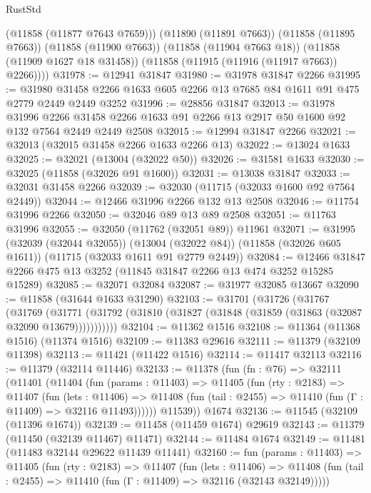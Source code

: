 \begin{lexlean}{RustStd}
\begin{coremodule}
          (@11858 (@11877 @7643 @7659)))
        (@11890 (@11891 @7663))
        (@11858 (@11895 @7663))
        (@11858 (@11900 @7663))
        (@11858 (@11904 @7663 @18))
        (@11858 (@11909 @1627 @18 @31458))
        (@11858 (@11915 (@11916 (@11917 @7663)) @2266))))
@31978 := @12941 @31847
@31980 := @31978 @31847 @2266
@31995 := @31980 @31458 @2266 @1633 @605 @2266 @13 @7685 @84 @1611 @91 @475 @2779 @2449 @2449 @3252
@31996 := @28856 @31847
@32013 := @31978
    @31996
    @2266
    @31458
    @2266
    @1633
    @91
    @2266
    @13
    @2917
    @50
    @1600
    @92
    @132
    @7564
    @2449
    @2449
    @2508
@32015 := @12994 @31847 @2266
@32021 := @32013 (@32015 @31458 @2266 @1633 @2266 @13)
@32022 := @13024 @1633
@32025 := @32021 (@13004 (@32022 @50))
@32026 := @31581 @1633
@32030 := @32025 (@11858 (@32026 @91 @1600))
@32031 := @13038 @31847
@32033 := @32031 @31458 @2266
@32039 := @32030 (@11715 (@32033 @1600 @92 @7564 @2449))
@32044 := @12466 @31996 @2266 @132 @13 @2508
@32046 := @11754 @31996 @2266
@32050 := @32046 @89 @13 @89 @2508
@32051 := @11763 @31996
@32055 := @32050 (@11762 (@32051 @89)) @11961
@32071 := @31995
    (@32039 (@32044 @32055))
    (@13004 (@32022 @84))
    (@11858 (@32026 @605 @1611))
    (@11715 (@32033 @1611 @91 @2779 @2449))
@32084 := @12466 @31847 @2266 @475 @13 @3252 (@11845 @31847 @2266 @13 @474 @3252 @15285 @15289)
@32085 := @32071 @32084
@32087 := @31977 @32085 @13667
@32090 := @11858 (@31644 @1633 @31290)
@32103 := @31701
    (@31726
      (@31767
        (@31769
          (@31771 (@31792 (@31810 (@31827 (@31848 (@31859 (@31863 (@32087 @32090 @13679)))))))))))
@32104 := @11362 @1516
@32108 := @11364 (@11368 @1516) (@11374 @1516)
@32109 := @11383 @29616
@32111 := @11379 (@32109 @11398)
@32113 := @11421 (@11422 @1516)
@32114 := @11417 @32113
@32116 := @11379 (@32114 @11446)
@32133 := @11378
    (fun (fn : @76) =>
    @32111
      (@11401
        (@11404
          (fun (params : @11403) =>
          @11405
            (fun (rty : @2183) =>
            @11407
              (fun (lets : @11406) =>
              @11408 (fun (tail : @2455) => @11410 (fun (Γ : @11409) => @32116 @11493))))))
        @11539))
    @1674
@32136 := @11545 (@32109 (@11396 @1674))
@32139 := @11458 (@11459 @1674) @29619
@32143 := @11379 (@11450 (@32139 @11467) @11471)
@32144 := @11484 @1674
@32149 := @11481 (@11483 @32144 @29622 @11439 @11441)
@32160 := fun (params : @11403) =>
  @11405
    (fun (rty : @2183) =>
    @11407
      (fun (lets : @11406) =>
      @11408 (fun (tail : @2455) => @11410 (fun (Γ : @11409) => @32116 (@32143 @32149)))))

\end{coremodule}
\end{lexlean}
